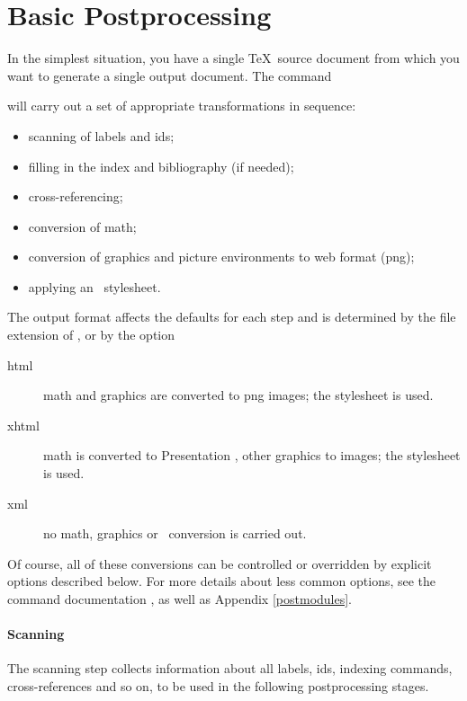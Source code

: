 \documentclass{report}
\begin{document}
\section[Postprocessing]{Basic Postprocessing}\label{usage.single}
In the simplest situation, you have a single \TeX\ source document
from which you want to generate a single output document.
The command
\begin{quote}
\end{quote}
will carry out a set of appropriate transformations in sequence:
\begin{itemize}
  \item scanning of labels and ids;
  \item filling in the index and bibliography (if needed);
  \item cross-referencing;
  \item conversion of math;
  \item conversion of graphics and picture environments to web format (png);
  \item applying an \XSLT\ stylesheet.
\end{itemize}
The output format affects the defaults for each step and is determined
by the file extension of , or by the option
\begin{quote}
\end{quote}
\begin{description}
 \item[html] math and graphics are converted to png images;
    the  stylesheet is used.
 \item[xhtml] math is converted to Presentation \MathML, other graphics to images;
    the  stylesheet is used.
 \item[xml] no math, graphics or \XSLT\ conversion is carried out.
\end{description}
Of course, all of these conversions can be controlled or overridden
by explicit options described below.
For more details about less common options, see the command
documentation , as well as Appendix \ref{postmodules}.

\paragraph{Scanning}
The scanning step collects information about all labels, ids,
indexing commands, cross-references and so on, to be used
in the following postprocessing stages.
\end{document}
